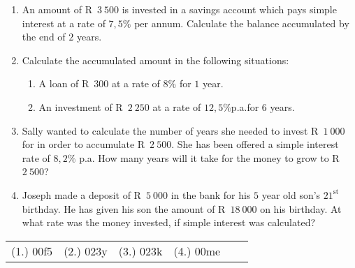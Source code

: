 % 
% 
% 
% 

\begin{exercises}{}{
    \begin{enumerate}[itemsep=6pt, label=\textbf{\arabic*}.]
	\item An amount of R~$3~500$ is invested in a savings account which pays simple interest at a rate of $7,5\%$ per annum. Calculate the balance accumulated by the end of $2$ years.

	\item Calculate the accumulated amount in the following situations:
	\begin{enumerate}[noitemsep, label=\textbf{(\alph*)} ]
	    \item A loan of R~$300$ at a rate of $8\%$ for $1$ year.

	    \item An investment of R~$2~250$ at a rate of $12,5\%$p.a.\@ for $6$ years.
	\end{enumerate}

	\item Sally wanted to calculate the number of years she needed to invest R~$1~000$ for in order to accumulate R~$2~500$. She has been offered a simple interest rate of $8,2\%$ p.a. How many years will it take for the money to grow to R~$2~500$?

	\item Joseph made a deposit of R~$5~000$ in the bank for his $5$ year old son's $21^{\mathrm{st}}$ birthday. He has given his son the amount of R~$18~000$ on his birthday. At what rate was the money invested, if simple interest was calculated?
    \end{enumerate}
\practiceinfo

\begin{tabular}[h]{cccccc}
	(1.) 00f5&(2.) 023y	&(3.) 023k &	(4.) 00me
\end{tabular}
}
\end{exercises}


